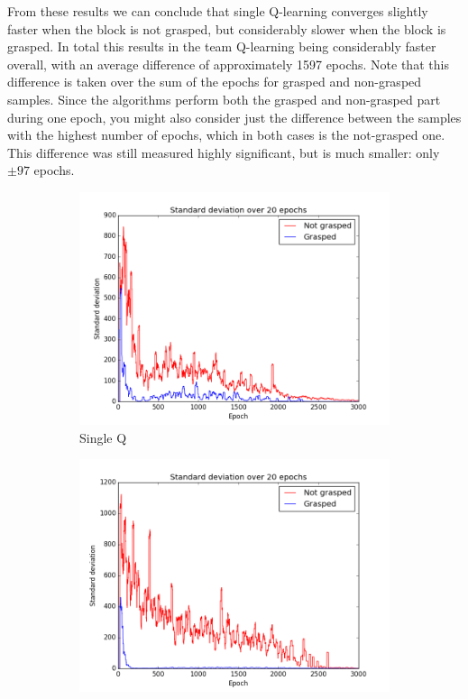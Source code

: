 From these results we can conclude that single Q-learning converges slightly faster when the block is not grasped, but considerably slower when the block is grasped. In total this results in the team Q-learning being considerably faster overall, with an average difference of approximately 1597 epochs. Note that this difference is taken over the sum of the epochs for grasped and non-grasped samples. Since the algorithms perform both the grasped and non-grasped part during one epoch, you might also consider just the difference between the samples with the highest number of epochs, which in both cases is the not-grasped one. This difference was still measured highly significant, but is much smaller: only $\pm 97$ epochs.

\begin{figure}[ht]
	\centering
	\begin{subfigure}{.48\textwidth}
		\centering
		\includegraphics[width=\textwidth]{images/Stdev_single.png}
		\caption{Single Q}
		\label{3a}
	\end{subfigure}
	\begin{subfigure}{0.48\textwidth}
		\centering
		\includegraphics[width=\textwidth]{images/Stdev_team.png}

\end{subfigure}
\end{figure}
